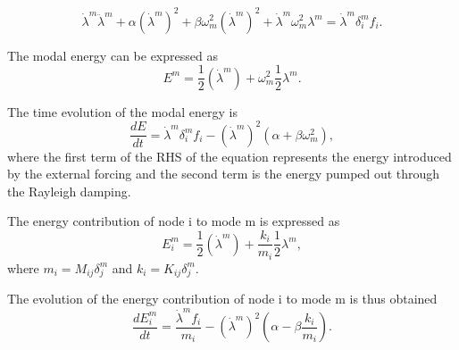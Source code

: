 \documentclass[12pt, letterpaper]{article}
\begin{document}
\begin{equation}
    \dot{\lambda}^m \ddot{\lambda}^m + \alpha (\dot{\lambda}^m)^2 + \beta \omega_m^2 (\dot{\lambda}^m)^2 + \dot{\lambda}^m \omega_m^2 \lambda^m = \dot{\lambda}^m \delta_i^m f_i.
\end{equation}

The modal energy can be expressed as
\begin{equation}
    E^m = \frac{1}{2} (\dot{\lambda}^m) + \omega_m^2 \frac{1}{2} \lambda^m.
\end{equation}

The time evolution of the modal energy is
\begin{equation}
    \frac{d E}{dt} = \dot{\lambda}^m \delta_i^m f_i - (\dot{\lambda}^m)^2(\alpha + \beta \omega_m^2),
\end{equation}
where the first term of the RHS of the equation represents the energy introduced by the external forcing and the second term is the energy pumped out through the Rayleigh damping. \newline

The energy contribution of node i to mode m is expressed as
\begin{equation}
    E_i^m = \frac{1}{2} (\dot{\lambda}^m) + \frac{k_i}{m_i} \frac{1}{2} \lambda^m,
\end{equation}
where $m_i = M_{ij} \delta_j^m$ and $k_i = K_{ij} \delta_j^m$.

The evolution of the energy contribution of node i to mode m is thus obtained 
\begin{equation}
    \frac{d E_i^m}{dt} = \frac{\dot{\lambda}^m f_i}{m_i} - (\dot{\lambda}^m)^2 (\alpha  - \beta \frac{k_i}{m_i}).
\end{equation}
\end{document}
